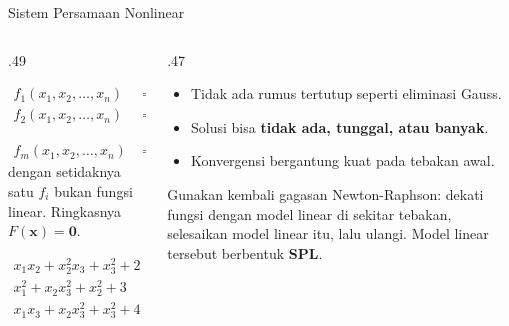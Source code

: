 \documentclass[aspectratio=169,10pt]{beamer}
\begin{document}
\begin{frame}{Sistem Persamaan Nonlinear}
\scriptsize
\begin{columns}[T,totalwidth=\textwidth]
\begin{column}{.49\textwidth}
\begin{bluebox}
\[
\begin{aligned}
f_1(x_1,x_2,\dots,x_n)&=0\\
f_2(x_1,x_2,\dots,x_n)&=0\\
&\;\;\vdots\\
f_m(x_1,x_2,\dots,x_n)&=0
\end{aligned}
\]
dengan setidaknya satu $f_i$ bukan fungsi linear. Ringkasnya $F(\mathbf{x})=\mathbf{0}$.
\end{bluebox}
\begin{orangebox}[Contoh]
\[
\begin{aligned}
x_1x_2+x_2^2x_3+x_3^2+2&=0\\
x_1^2+x_2x_3^2+x_2^2+3&=0\\
x_1x_3+x_2x_3^2+x_3^2+4&=0
\end{aligned}
\]
\end{orangebox}
\end{column}
\begin{column}{.47\textwidth}
\begin{greenbox}
\begin{itemize}\setlength\itemsep{2pt}
\item Tidak ada rumus tertutup seperti eliminasi Gauss.
\item Solusi bisa \textbf{tidak ada, tunggal, atau banyak}.
\item Konvergensi bergantung kuat pada tebakan awal.
\end{itemize}
\end{greenbox}
\begin{goldbox}[Strateginya]
Gunakan kembali gagasan Newton-Raphson: dekati fungsi dengan model linear di sekitar tebakan, selesaikan model linear itu, lalu ulangi. Model linear tersebut berbentuk \textbf{SPL}.
\end{goldbox}
\end{column}
\end{columns}
\end{frame}
\end{document}
